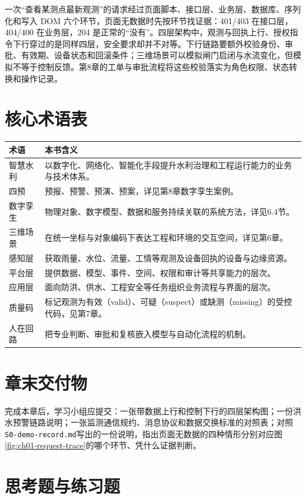 一次“查看某测点最新观测”的请求经过页面脚本、接口层、业务层、数据库、序列化和写入 DOM 六个环节，页面无数据时先按环节找证据：401/403 在接口层，404/400 在业务层，204 是正常的“没有”。四层架构中，观测与回执上行、授权指令下行穿过的是同样四层，安全要求却并不对等。下行链路要额外校验身份、审批、有效期、设备状态和回滚条件；三维场景可以模拟闸门启闭与水流变化，但模拟不等于控制反馈。第8章的工单与审批流程将这些校验落实为角色权限、状态转换和操作记录。
\section*{核心术语表}

\begin{longtable}{p{2.6cm}p{10.0cm}}
\toprule
术语 & 本书含义 \\
\midrule
智慧水利 & 以数字化、网络化、智能化手段提升水利治理和工程运行能力的业务与技术体系。\\
四预 & 预报、预警、预演、预案，详见第8章数字孪生案例。\\
数字孪生 & 物理对象、数字模型、数据和服务持续关联的系统方法，详见6.4节。\\
三维场景 & 在统一坐标与对象编码下表达工程和环境的交互空间，详见第6章。\\
感知层 & 获取雨量、水位、流量、工情等观测及设备回执的设备与边缘资源。\\
平台层 & 提供数据、模型、事件、空间、权限和审计等共享能力的层次。\\
应用层 & 面向防洪、供水、工程安全等任务组织业务流程与界面的层次。\\
质量码 & 标记观测为有效（valid）、可疑（suspect）或缺测（missing）的受控代码，见第7章。\\
人在回路 & 把专业判断、审批和复核嵌入模型与自动化流程的机制。\\
\bottomrule
\end{longtable}

\section*{章末交付物}

完成本章后，学习小组应提交：一张带数据上行和控制下行的四层架构图；一份洪水预警链路说明；一张监测通信规约、消息协议和数据交换标准的对照表；对照\texttt{S0-demo-record.md}写出的一份说明，指出页面无数据的四种情形分别对应图\ref{fig:ch01-request-trace}的哪个环节、凭什么证据判断。

\section*{思考题与练习题}


